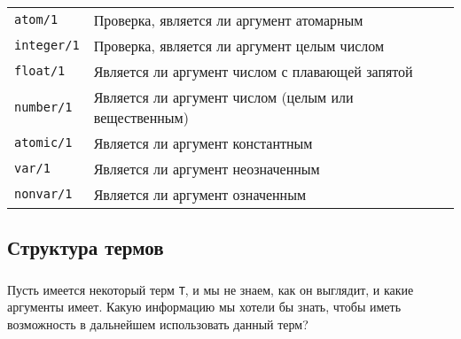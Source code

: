 \begin{frame}

	\frametitle{\insertsection}
	\framesubtitle{\insertsubsection}
	
	\begin{table}
		\centering
		\begin{tabular}{ l l }
			\rowcolor{LightGray} \texttt{atom/1} & Проверка, является ли аргумент атомарным \\
			\rowcolor{LightGray} \texttt{integer/1} & Проверка, является ли аргумент целым числом \\
			\rowcolor{LightGray} \texttt{float/1} & Является ли аргумент числом с плавающей запятой \\
			\rowcolor{LightGray} \texttt{number/1} & Является ли аргумент числом (целым или вещественным) \\
			\rowcolor{LightGray} \texttt{atomic/1} & Является ли аргумент константным \\
			\rowcolor{LightGray} \texttt{var/1} & Является ли аргумент неозначенным \\
			\rowcolor{LightGray} \texttt{nonvar/1} & Является ли аргумент означенным
		\end{tabular}
	\end{table}

\end{frame}


\subsection{Структура термов}

\begin{frame}

	\frametitle{\insertsection}
	\framesubtitle{\insertsubsection}
	
	Пусть имеется некоторый терм \texttt{T}, и мы не знаем, как он выглядит, и какие аргументы имеет.
	Какую информацию мы хотели бы знать, чтобы иметь возможность в дальнейшем использовать данный терм?
	

\end{frame}


